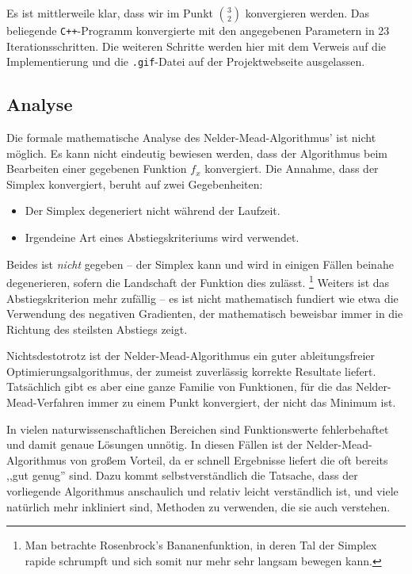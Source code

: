 \documentclass[naustrian]{article}
\begin{document}
{Es ist mittlerweile klar, dass wir im Punkt $\binom{3}{2}$ konvergieren werden.
Das beliegende {\tt C++}-Programm konvergierte mit den angegebenen Parametern
in 23 Iterationsschritten. Die weiteren Schritte werden hier mit dem Verweis
auf die Implementierung und die {\tt .gif}-Datei auf der Projektwebseite ausgelassen.


\subsection{Analyse}

Die formale mathematische Analyse des Nelder-Mead-Algorithmus' ist nicht möglich.
Es kann nicht eindeutig bewiesen werden, dass der Algorithmus beim Bearbeiten einer gegebenen
Funktion $f_x$ konvergiert. Die Annahme, dass der Simplex konvergiert, beruht auf zwei
Gegebenheiten:

\begin{itemize}
\item Der Simplex degeneriert nicht während der Laufzeit.
\item Irgendeine Art eines Abstiegskriteriums wird verwendet.
\end{itemize}

Beides ist \emph{nicht} gegeben -- der Simplex kann und wird in einigen Fällen
beinahe degenerieren, sofern die Landschaft der Funktion dies
zulässt.
\footnote{Man betrachte Rosenbrock's Bananenfunktion, in deren Tal der Simplex
    rapide schrumpft und sich somit nur mehr sehr langsam bewegen
kann.} Weiters ist das Abstiegskriterion mehr zufällig -- es ist nicht mathematisch
fundiert wie etwa die Verwendung des negativen Gradienten, der mathematisch beweisbar
immer in die Richtung des steilsten Abstiegs zeigt. \cite{nelder-mead-scholarpedia}

Nichtsdestotrotz ist der Nelder-Mead-Algorithmus ein guter ableitungsfreier
Optimierungsalgorithmus, der zumeist zuverlässig korrekte Resultate liefert.
Tatsächlich gibt es aber eine ganze Familie von Funktionen, für die das Nelder-Mead-Verfahren
immer zu einem Punkt konvergiert, der nicht das Minimum ist\cite{nelder-mead-convergence}.

In vielen naturwissenschaftlichen Bereichen sind Funktionswerte fehlerbehaftet und damit
genaue Lösungen unnötig. In diesen Fällen ist der Nelder-Mead-Algorithmus von großem
Vorteil, da er schnell Ergebnisse liefert die oft bereits ,,gut genug'' sind.
Dazu kommt selbstverständlich die Tatsache, dass der vorliegende Algorithmus anschaulich
und relativ leicht verständlich ist, und viele natürlich mehr inkliniert sind, Methoden
zu verwenden, die sie auch verstehen.

}
\end{document}
